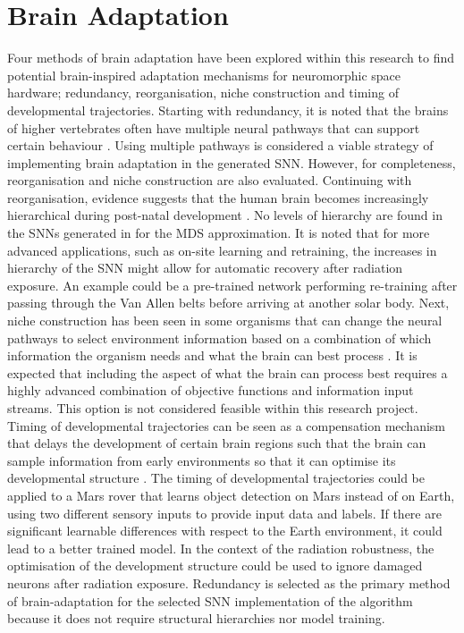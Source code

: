 \section{Brain Adaptation}\label{sec:brain_adaptation}
Four methods of brain adaptation have been explored within this research to find potential brain-inspired adaptation mechanisms for neuromorphic space hardware; redundancy, reorganisation, niche construction and timing of developmental trajectories.  Starting with redundancy, it is noted that the brains of higher vertebrates often have multiple neural pathways that can support certain behaviour \cite{johnson_brain_2015}. Using multiple pathways is considered a viable strategy of implementing brain adaptation in the generated SNN. However, for completeness, reorganisation and niche construction are also evaluated. Continuing with reorganisation, evidence suggests that the human brain becomes increasingly hierarchical during post-natal development \cite{supekar_brain_2013}. No levels of hierarchy are found in the SNNs generated in for the MDS approximation. It is noted that for more advanced applications, such as on-site learning and retraining, the increases in hierarchy of the SNN might allow for automatic recovery after radiation exposure. An example could be a pre-trained network performing re-training after passing through the Van Allen belts before arriving at another solar body. Next, niche construction has been seen in some organisms that can change the neural pathways to select environment information based on a combination of which information the organism needs and what the brain can best process \cite{johnson_brain_2015}. It is expected that including the aspect of what the brain can process best requires a highly advanced combination of objective functions and information input streams. This option is not considered feasible within this research project. Timing of developmental trajectories can be seen as a compensation mechanism that delays the development of certain brain regions such that the brain can sample information from early environments so that it can optimise its developmental structure \cite{johnson_brain_2015}. The timing of developmental trajectories could be applied to a Mars rover that learns object detection on Mars instead of on Earth, using two different sensory inputs to provide input data and labels. If there are significant learnable differences with respect to the Earth environment, it could lead to a better trained model. In the context of the radiation robustness, the optimisation of the development structure could be used to ignore damaged neurons after radiation exposure. Redundancy is selected as the primary method of brain-adaptation for the selected SNN implementation of the algorithm because it does not require structural hierarchies nor model training.

